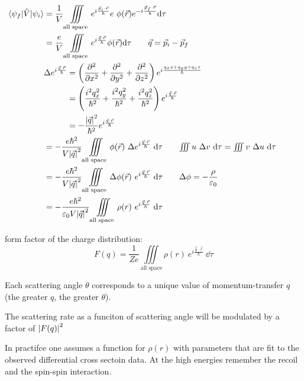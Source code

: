 \documentclass[10pt, a4paper, twocolumn]{article}
\newcommand{\eps}{\ensuremath{\varepsilon _0}}
\begin{document}
\begin{equation*}
\begin{aligned}
\hspace{-3em} \mel{\psi _f}{\hat V}{\psi _i}&=\frac1V
\iiint\limits_\text{all space}
e^{i\frac{\vec p _i \cdot \vec r}{\hbar}} e\ \phi (\vec r)
e^{-i\frac{\vec p _f \cdot \vec r}{\hbar}} \dd \tau
\\&=\frac{e}{V} \iiint\limits_\text{all space}
e^{i\frac{\vec q \cdot \vec r}{\hbar}}
\phi (\vec r) \dd \tau
\qquad \vec q = \vec p_i - \vec p_f
\\&\Delta e^{i\frac{\vec q \cdot \vec r}{\hbar}}
=\left(\pdv[2]{x}+\pdv[2]{y}+\pdv[2]{z}\right)
e^{i\frac{q_xx+q_yy+q_zz}{\hbar}}
\\& \phantom{\Delta e^{i\frac{\vec q \cdot \vec r}{\hbar}}}
=\left(\frac{i^2q_x^2}{\hbar^2} +
\frac{i^2q_y^2}{\hbar^2} +
\frac{i^2q_z^2}{\hbar^2}
\right) e^{i\frac{\vec q\cdot\vec r}{\hbar}}
\\& \phantom{\Delta e^{i\frac{\vec q \cdot \vec r}{\hbar}}}
=-\frac{\abs{\vec q}^2}{\hbar ^2}
e^{i\frac{\vec q \cdot \vec r}{\hbar}}
\\&=-\frac{e\hbar ^2}{V\abs{\vec q}^2}
\iiint\limits_\text{all space} \phi (\vec r)\ 
\Delta e^{i\frac{\vec q\cdot \vec r}{\hbar}}\ \dd \tau
\qquad \textstyle{\iiint u\ \Delta v\ \dd \tau
=\iiint v\ \Delta u\ \dd \tau}
\\&=-\frac{e\hbar ^2}{V\abs{\vec q}^2}
\iiint\limits_\text{all space} \Delta \phi (\vec r)\ 
e^{i\frac{\vec q\cdot \vec r}{\hbar}}\ \dd \tau
\qquad \Delta \phi = -\frac{\rho}{\eps}
\\&=-\frac{e\hbar ^2}{\eps V\abs{\vec q}^2}
\iiint\limits_\text{all space} \rho (r)\ 
e^{i\frac{\vec q\cdot \vec r}{\hbar}}\ \dd \tau
\end{aligned}
\end{equation*}

form factor of the charge distribution:
\[F(q) = \frac{1}{Ze}\iiint\limits_\text{all space}
\rho (r)\ e^{i\frac{\vec q\cdot \vec r}{\hbar}}
\ \dd \tau \]

Each scattering angle $\theta$ corresponds to a unique value of momentum-transfer $q$ (the greater $q$, the greater $\theta$).  

The scattering rate as a funciton of scattering angle will be modulated by a factor of $\abs{F(q)}^2$

In practifce one assumes a function for $\rho (r)$ with parameters that are fit to the observed differential cross sectoin data. At the high energies remember the recoil and the spin-spin interaction.
\end{document}
